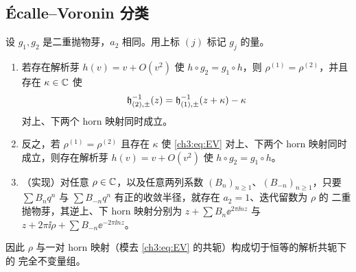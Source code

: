 \subsection{Écalle--Voronin 分类}

\begin{theorem}\label{ch3:thm:ecalle-voronin}
设 $g_1,g_2$ 是二重抛物芽，$a_2$ 相同。用上标 $(j)$ 标记 $g_j$ 的量。
\begin{enumerate}
\item 若存在解析芽 $h(v)=v+O(v^2)$ 使 $h\circ g_2=g_1\circ h$，则 $\rho^{(1)}=\rho^{(2)}$，并且存在
 $\kappa\in\mathbb{C}$ 使
 \begin{equation}\label{ch3:eq:EV}
  \mathfrak h_{(2),\pm}^{-1}(z)=\mathfrak h_{(1),\pm}^{-1}(z+\kappa)-\kappa
 \end{equation}
 对上、下两个 horn 映射同时成立。
\item 反之，若 $\rho^{(1)}=\rho^{(2)}$ 且存在 $\kappa$ 使 \eqref{ch3:eq:EV} 对上、下两个 horn
 映射同时成立，则存在解析芽 $h(v)=v+O(v^2)$ 使 $h\circ g_2=g_1\circ h$。
\item （实现）对任意 $\rho\in\mathbb{C}$，以及任意两列系数 $(B_n)_{n\ge1}$、$(B_{-n})_{n\ge1}$，只要
 $\sum B_nq^n$ 与 $\sum B_{-n}q^n$ 有正的收敛半径，就存在 $a_2=1$、迭代留数为 $\rho$ 的
 二重抛物芽，其逆上、下 horn 映射分别为 $z+\sum B_n\ee^{2\pi\ii nz}$ 与
 $z+2\pi\ii\rho+\sum B_{-n}\ee^{-2\pi\ii nz}$。
\end{enumerate}
因此 $\rho$ 与一对 horn 映射（模去 \eqref{ch3:eq:EV} 的共轭）构成切于恒等的解析共轭下的
完全不变量组。
\end{theorem}

